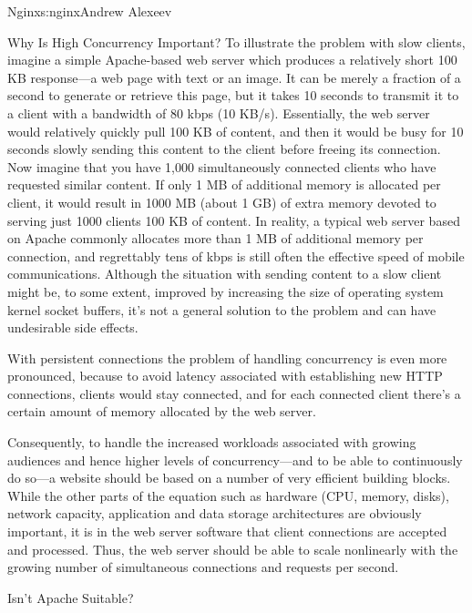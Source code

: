 \begin{aosachapter}{Nginx}{s:nginx}{Andrew Alexeev}
\begin{aosasect1}{Why Is High Concurrency Important?}
To illustrate the problem with slow clients, imagine a simple
Apache-based web server which produces a relatively short 100 KB
response---a web page with text or an image. It can be merely a
fraction of a second to generate or retrieve this page, but it takes
10 seconds to transmit it to a client with a bandwidth of 80 kbps (10
KB/s). Essentially, the web server would relatively quickly pull 100
KB of content, and then it would be busy for 10 seconds slowly sending
this content to the client before freeing its connection. Now imagine
that you have 1,000 simultaneously connected clients who have
requested similar content. If only 1 MB of additional memory is
allocated per client, it would result in 1000 MB (about 1 GB) of
extra memory devoted to serving just 1000 clients 100 KB of
content. In reality, a typical web server based on Apache commonly
allocates more than 1 MB of additional memory per connection, and
regrettably tens of kbps is still often the effective speed of mobile
communications. Although the situation with sending content to a slow
client might be, to some extent, improved by increasing the size of
operating system kernel socket buffers, it's not a general solution to
the problem and can have undesirable side effects.

With persistent connections the problem of handling concurrency is
even more pronounced, because to avoid latency associated with
establishing new HTTP connections, clients would stay connected, and
for each connected client there's a certain amount of memory allocated
by the web server.

Consequently, to handle the increased workloads associated with
growing audiences and hence higher levels of concurrency---and to be
able to continuously do so---a website should be based on a number of
very efficient building blocks. While the other parts of the equation
such as hardware (CPU, memory, disks), network capacity, application
and data storage architectures are obviously important, it is in the
web server software that client connections are accepted and
processed. Thus, the web server should be able to scale nonlinearly
with the growing number of simultaneous connections and requests per
second.

\begin{aosasect2}{Isn't Apache Suitable?}


\end{aosasect2}
\end{aosasect1}
\end{aosachapter}
